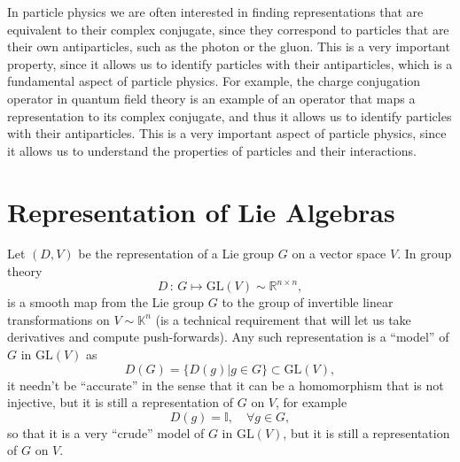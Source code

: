 In particle physics we are often interested in finding representations that are equivalent to their complex conjugate, since they correspond to particles that are their own antiparticles, such as the photon or the gluon. This is a very important property, since it allows us to identify particles with their antiparticles, which is a fundamental aspect of particle physics. For example, the charge conjugation operator in quantum field theory is an example of an operator that maps a representation to its complex conjugate, and thus it allows us to identify particles with their antiparticles. This is a very important aspect of particle physics, since it allows us to understand the properties of particles and their interactions.

\section{Representation of Lie Algebras}

\begin{definition}
    Let \((D,V)\) be the representation of a Lie group \(G\) on a vector space \(V\). In group theory
    \[
        D \,:\, G \mapsto \mathrm{GL}(V)\sim \mathbb{R}^{n \times n},
    \]
    is a smooth map from the Lie group \(G\) to the group of invertible linear transformations on \(V \sim \mathbb{K}^n\) (is a technical requirement that will let us take derivatives and compute push-forwards). Any such representation is a ``model'' of \(G\) in \(\mathrm{GL}(V)\) as
    \[
        D(G) = \{ D(g) | g \in G\} \subset \mathrm{GL}(V),
    \]
    it needn't be ``accurate'' in the sense that it can be a homomorphism that is not injective, but it is still a representation of \(G\) on \(V\), for example
    \[
        D(g) = \mathbb{I}, \quad \forall g \in G,
    \]
    so that it is a very ``crude'' model of \(G\) in \(\mathrm{GL}(V)\), but it is still a representation of \(G\) on \(V\).
\end{definition}


